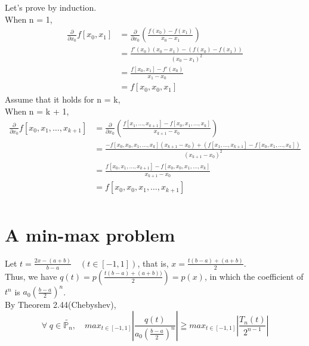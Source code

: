 \documentclass[UTF8]{ctexart}
\begin{document}
\section{}
Let's prove by induction.\\
When n = 1,\\
\begin{equation}
    \begin{aligned}
        \frac{\partial}{\partial x_0}f[x_0,x_1] &= \frac{\partial}{\partial x_0}\left( \frac{f(x_0) - f(x_1)}{x_0 - x_1} \right)\\
        &= \frac{f'(x_0)(x_0-x_1) - (f(x_0) - f(x_1))}{(x_0 - x_1)^2}\\
        &= \frac{f[x_0,x_1] - f'(x_0)}{x_1 - x_0}\\
        & = f[x_0,x_0,x_1]
    \nonumber
    \end{aligned}
\end{equation}
Assume that it holds for n = k,\\
When n = k + 1,
\begin{equation}
    \begin{aligned}
         \frac{\partial}{\partial x_0}f[x_0,x_1,\dots , x_{k+1}] &=  \frac{\partial}{\partial x_0}\left( \frac{f[x_1,\dots , x_{k+1}] - f[x_0,x_1,\dots,x_k]}{x_{k+1} - x_0} \right)\\
         &= \frac{-f[x_0,x_0,x_1,\dots,x_k](x_{k+1}-x_0) + (f[x_1,\dots , x_{k+1}] - f[x_0,x_1,\dots,x_k])}{(x_{k+1} - x_0)^2}\\
         &= \frac{f[x_0,x_1,\dots,x_{k+1}] - f[x_0,x_0,x_1,\dots,x_k]}{x_{k+1} - x_0}\\
         &= f[x_0,x_0,x_1,\dots,x_{k+1}]\\
    \nonumber
    \end{aligned}
\end{equation}

\section{A min-max problem}
\noindent Let $t = \frac{2x - (a+b)}{b-a}\quad (t \in [-1,1])$, that is, $x = \frac{t(b-a)+(a+b)}{2}$.\\
Thus, we have $q(t) = p\left( \frac{t(b-a)+(a+b))}{2}\right) = p(x)$, in which the coefficient of $t^n$ is $a_0 \left( \frac{b-a}{2} \right)^n$.\\
By Theorem 2.44(Chebyshev),
$$\forall \; q \in \tilde{\mathbb{P}_n},\quad max_{t \in [-1,1]} \left| \frac{q(t)}{a_0 \left( \frac{b-a}{2} \right)^n}\right| \geqq max_{t \in [-1,1]} \left| \frac{T_n(t)}{2^{n-1}}\right| $$
\end{document}
